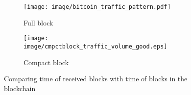 \begin{comment}
\paragraphb{Block propagation latencies.} The propagation delay in the Bitcoin network is due to transmission delays and block verification by the receiving node at each hop. The transmission delay is the time to exchanging \textit{inv} and \textit{get data} messages, and sending the block via a \textit{block} message. 

 We measure block propagation delay by subtracting the receiving time of the block message and the time stamp in the header of the block message. Figures~\ref{fig:cmpctblock_time_difference} and \ref{fig:prop_delay} show the histogram of propagation delay for  $6000$ blocks in compact block and full block relaying, respectively. 
As shown in the figures, we can model this empirical data using a Beta distribution~\cite{probabilitybook}. %

\begin{figure}[!t]%
\begin{subfigure}{.48\linewidth}
\centering
\texttt{[image: image/cmpctblock\_time\_difference.eps]}
\caption{Compact block}
\label{fig:cmpctblock_time_difference}
\end{subfigure}
\centering
\begin{subfigure}{.48\linewidth}
\texttt{[image: image/prop\_delay\_beta.eps]}
\caption{Full block}
\label{fig:prop_delay}
\end{subfigure}
\caption{Histogram of block propagation delay}
\label{fig:prop_delay_full_compact}
\end{figure} 

\end{comment}


 \begin{figure*}[!t]
\begin{subfigure}{.48\linewidth}
\centering
\texttt{[image: image/bitcoin\_traffic\_pattern.pdf]}
\caption{Full block}
\label{fig:bitcoin_traffic_pattern}
\end{subfigure}
\centering
\begin{subfigure}{.48\linewidth}
\texttt{[image: image/cmpctblock\_traffic\_volume\_good.eps]}
\caption{Compact block}
\label{fig:cmpctblock_traffic_volume_detectable}
\end{subfigure}
\caption{Comparing time of received blocks with time of blocks in the blockchain}
\end{figure*}

